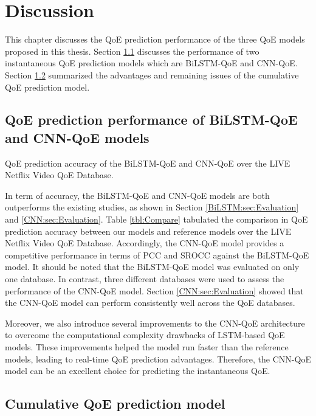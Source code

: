 \chapter{Discussion}
\label{ch:Discussion}


\renewcommand{\SectionsDir}{Chapter6/Sections}
\renewcommand{\FigsDir}{Chapter6/Figs}
\renewcommand{\TablesDir}{Chapter6/Tables}


This chapter discusses the QoE prediction performance of the three QoE models proposed in this thesis.
Section \ref{Discussion:sec:InstantaneousQoE} discusses the performance of two instantaneous QoE prediction models which are BiLSTM-QoE and CNN-QoE. 
Section \ref{Discussion:sec:CumulativeQoE} summarized the advantages and remaining issues of the cumulative QoE prediction model.


\section{QoE prediction performance of BiLSTM-QoE and CNN-QoE models}
\label{Discussion:sec:InstantaneousQoE}

\Table[tb]{\TablesDir/compare}
  {QoE prediction accuracy of the BiLSTM-QoE and CNN-QoE over the LIVE Netflix Video QoE Database.\label{tbl:Compare}}

In term of accuracy, the BiLSTM-QoE and CNN-QoE models are both outperforms the existing studies, as shown in Section \ref{BiLSTM:sec:Evaluation} and \ref{CNN:sec:Evaluation}.
Table \ref{tbl:Compare} tabulated the comparison in QoE prediction accuracy between our models and reference models over the LIVE Netflix Video QoE Database.
Accordingly, the CNN-QoE model provides a competitive performance in terms of PCC and SROCC against the BiLSTM-QoE model.
It should be noted that the BiLSTM-QoE model was evaluated on only one database.
In contrast, three different databases were used to assess the performance of the CNN-QoE model.
Section \ref{CNN:sec:Evaluation} showed that the CNN-QoE model can perform consistently well across the QoE databases.


Moreover, we also introduce several improvements to the CNN-QoE architecture to overcome the computational complexity drawbacks of LSTM-based QoE models.
These improvements helped the model run faster than the reference models, leading to real-time QoE prediction advantages.
Therefore, the CNN-QoE model can be an excellent choice for predicting the instantaneous QoE.


\section{Cumulative QoE prediction model}
\label{Discussion:sec:CumulativeQoE}

